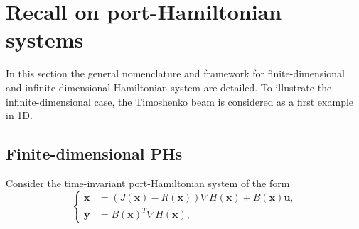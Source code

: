 \documentclass[preprint,12pt]{elsarticle}
\begin{document}
	
\section{Recall on port-Hamiltonian systems}
In this section the general nomenclature and framework for finite-dimensional and infinite-dimensional Hamiltonian system are detailed. To illustrate the infinite-dimensional case, the Timoshenko beam is considered as a first example in 1D.

\subsection{Finite-dimensional PHs}
Consider the time-invariant port-Hamiltonian system of
the form
\begin{equation}
\label{eq:finitePH}
\begin{cases}
\dot{ \bm{x} } &= (J(\bm{x}) - R(\bm{x})) \nabla H(\bm{x}) + B(\bm{x})\bm{u}, \\
\bm{y} &= B(\bm{x})^T \nabla H(\bm{x}),
\end{cases}
\end{equation}
\end{document}
